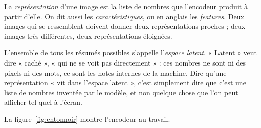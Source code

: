 \begin{definition}[La représentation][representation]
La \emph{représentation} d'une image est la liste de nombres que l'encodeur
produit à partir d'elle. On dit aussi les \emph{caractéristiques}, ou en
anglais les \emph{features}. Deux images qui se ressemblent doivent donner
deux représentations proches ; deux images très différentes, deux
représentations éloignées.
\end{definition}

\begin{definition}
L'ensemble de tous les résumés possibles s'appelle l'\emph{espace latent}.
« Latent » veut dire « caché », « qui ne se voit pas directement » : ces
nombres ne sont ni des pixels ni des mots, ce sont les notes internes de la
machine. Dire qu'une représentation « vit dans l'espace latent », c'est
simplement dire que c'est une liste de nombres inventée par le modèle, et non
quelque chose que l'on peut afficher tel quel à l'écran.
\end{definition}

La figure~\ref{fig:entonnoir} montre l'encodeur au travail.

